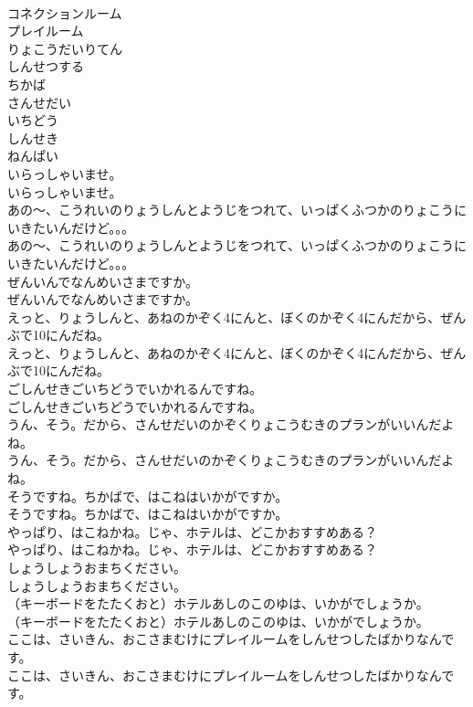 \documentclass[8pt]{extreport}
\begin{document}
\begin{CJK}{UTF8}{min}
\\	コネクションルーム
\\	プレイルーム
\\	りょこうだいりてん
\\	しんせつする
\\	ちかば
\\	さんせだい
\\	いちどう
\\	しんせき
\\	ねんぱい
\\	いらっしゃいませ。	
\\	いらっしゃいませ。　 
\\	あの～、こうれいのりょうしんとようじをつれて、いっぱくふつかのりょこうにいきたいんだけど。。。	
\\	あの～、こうれいのりょうしんとようじをつれて、いっぱくふつかのりょこうにいきたいんだけど。。。 
\\	ぜんいんでなんめいさまですか。	
\\	ぜんいんでなんめいさまですか。 
\\	えっと、りょうしんと、あねのかぞく4にんと、ぼくのかぞく4にんだから、ぜんぶで10にんだね。	
\\	えっと、りょうしんと、あねのかぞく4にんと、ぼくのかぞく4にんだから、ぜんぶで10にんだね。 
\\	ごしんせきごいちどうでいかれるんですね。	
\\	ごしんせきごいちどうでいかれるんですね。 
\\	うん、そう。だから、さんせだいのかぞくりょこうむきのプランがいいんだよね。	
\\	うん、そう。だから、さんせだいのかぞくりょこうむきのプランがいいんだよね。 
\\	そうですね。ちかばで、はこねはいかがですか。	
\\	そうですね。ちかばで、はこねはいかがですか。 
\\	やっぱり、はこねかね。じゃ、ホテルは、どこかおすすめある？	
\\	やっぱり、はこねかね。じゃ、ホテルは、どこかおすすめある？ 
\\	しょうしょうおまちください。	
\\	しょうしょうおまちください。 
\\	（キーボードをたたくおと）ホテルあしのこのゆは、いかがでしょうか。	
\\	（キーボードをたたくおと）ホテルあしのこのゆは、いかがでしょうか。 
\\	ここは、さいきん、おこさまむけにプレイルームをしんせつしたばかりなんです。	
\\	ここは、さいきん、おこさまむけにプレイルームをしんせつしたばかりなんです。 

\end{CJK}
\end{document}
